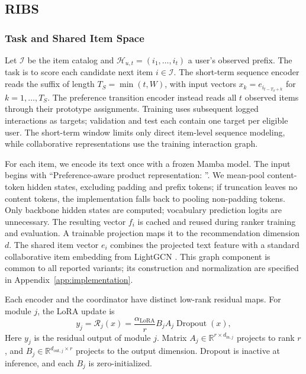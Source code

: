 \documentclass[11pt]{article}
\begin{document}
\subsection{RIBS}
\label{sec:ribs}

\subsubsection{Task and Shared Item Space}
Let $\mathcal I$ be the item catalog and $\mathcal H_{u,t}=(i_1,\ldots,i_t)$ a user's observed prefix. The task is to score each candidate next item $i\in\mathcal I$. The short-term sequence encoder reads the suffix of length $T_S=\min(t,W)$, with input vectors $x_k=e_{i_{t-T_S+k}}$ for $k=1,\ldots,T_S$. The preference transition encoder instead reads all $t$ observed items through their prototype assignments. Training uses subsequent logged interactions as targets; validation and test each contain one target per eligible user. The short-term window limits only direct item-level sequence modeling, while collaborative representations use the training interaction graph.

For each item, we encode its text once with a frozen Mamba model. The input begins with ``Preference-aware product representation: ''. We mean-pool content-token hidden states, excluding padding and prefix tokens; if truncation leaves no content tokens, the implementation falls back to pooling non-padding tokens. Only backbone hidden states are computed; vocabulary prediction logits are unnecessary. The resulting vector $f_i$ is cached and reused during ranker training and evaluation. A trainable projection maps it to the recommendation dimension $d$.
The shared item vector $e_i$ combines the projected text feature with a standard collaborative item embedding from LightGCN \citep{LightGCN}. This graph component is common to all reported variants; its construction and normalization are specified in Appendix~\ref{app:implementation}.

Each encoder and the coordinator have distinct low-rank residual maps. For module $j$, the LoRA update is
\begin{equation}
 y_j=\mathcal R_j(x)=\frac{\alpha_{\mathrm{LoRA}}}{r}B_j A_j\operatorname{Dropout}(x),
\end{equation}
Here $y_j$ is the residual output of module $j$. Matrix $A_j\in\mathbb R^{r\times d_{\mathrm{in},j}}$ projects to rank $r$, and $B_j\in\mathbb R^{d_{\mathrm{out},j}\times r}$ projects to the output dimension. Dropout is inactive at inference, and each $B_j$ is zero-initialized. 
\end{document}
